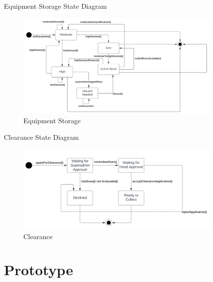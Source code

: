 \documentclass[20pt]{beamer}
\numberwithin{figure}{section}
\begin{document}
\begin{frame}{Equipment Storage State Diagram}

     \begin{figure}
        \centering
        \includegraphics[width= 0.9\textwidth , height= 0.6\paperheight]{EquipmentStorageState.png}
        \caption{Equipment Storage}
        \label{fig:40}
    \end{figure}

\end{frame}

\begin{frame}{Clearance State Diagram}

     \begin{figure}
        \centering
        \includegraphics[width= 0.9\textwidth , height= 0.6\paperheight]{ClearanceState.png}
        \caption{Clearance}
        \label{fig:41}
    \end{figure}

\end{frame}



\section {Prototype }
\end{document}
